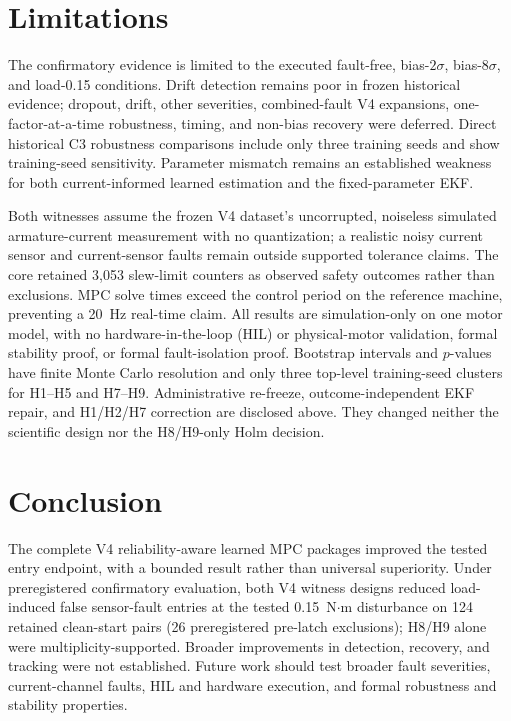 \documentclass[conference]{IEEEtran}
\begin{document}
\section{Limitations}
\label{sec:limitations}
The confirmatory evidence is limited to the executed fault-free,
bias-$2\sigma$, bias-$8\sigma$, and load-0.15 conditions. Drift detection
remains poor in frozen historical evidence; dropout, drift, other severities,
combined-fault V4 expansions, one-factor-at-a-time robustness, timing, and non-bias recovery
were deferred. Direct historical C3 robustness comparisons include only three
training seeds and show training-seed sensitivity. Parameter mismatch remains
an established weakness for both current-informed learned estimation and the
fixed-parameter EKF.

Both witnesses assume the frozen V4 dataset's uncorrupted, noiseless simulated
armature-current measurement with no quantization; a realistic noisy current
sensor and current-sensor faults remain outside supported tolerance claims.
The core retained 3{,}053
slew-limit counters as observed safety outcomes rather than exclusions. MPC
solve times exceed the control period on the reference machine, preventing a
20~Hz real-time claim. All results are simulation-only on one motor model,
with no hardware-in-the-loop (HIL) or physical-motor validation, formal stability proof, or formal
fault-isolation proof. Bootstrap intervals and $p$-values have finite
Monte Carlo resolution and only three top-level training-seed clusters for
H1--H5 and H7--H9. Administrative re-freeze, outcome-independent EKF repair,
and H1/H2/H7 correction are disclosed above. They changed neither the
scientific design nor the H8/H9-only Holm decision.

\newpage
\section{Conclusion}
\label{sec:conclusion}
The complete V4 reliability-aware learned MPC packages improved the tested
entry endpoint, with a bounded result rather than universal superiority.
Under preregistered confirmatory evaluation, both V4 witness designs reduced
load-induced false sensor-fault entries at the tested 0.15~N$\cdot$m
disturbance on 124 retained clean-start pairs (26 preregistered pre-latch
exclusions); H8/H9 alone were multiplicity-supported. Broader improvements
in detection, recovery, and tracking were not established. Future work should test broader fault severities,
current-channel faults, HIL and hardware execution, and formal robustness and
stability properties.



\end{document}
